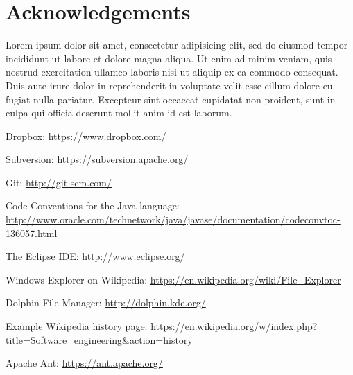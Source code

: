 \documentclass[12pt,a4paper]{article}
\begin{document}
\section{Acknowledgements}
Lorem ipsum dolor sit amet, consectetur adipisicing elit, sed do eiusmod tempor incididunt ut labore et dolore magna aliqua. Ut enim ad minim veniam, quis nostrud exercitation ullamco laboris nisi ut aliquip ex ea commodo consequat. Duis aute irure dolor in reprehenderit in voluptate velit esse cillum dolore eu fugiat nulla pariatur. Excepteur sint occaecat cupidatat non proident, sunt in culpa qui officia deserunt mollit anim id est laborum.

\begin{thebibliography}{9}

  Dropbox: \url{https://www.dropbox.com/}
  
  Subversion: \url{https://subversion.apache.org/}

  Git: \url{http://git-scm.com/}

  Code Conventions for the Java language: \url{http://www.oracle.com/technetwork/java/javase/documentation/codeconvtoc-136057.html}
  
  The Eclipse IDE: \url{http://www.eclipse.org/}

  Windows Explorer on Wikipedia: \url{https://en.wikipedia.org/wiki/File_Explorer}

  Dolphin File Manager: \url{http://dolphin.kde.org/}
  
  Example Wikipedia history page: \url{https://en.wikipedia.org/w/index.php?title=Software_engineering&action=history}
  
  Apache Ant: \url{https://ant.apache.org/}

\end{thebibliography}
\end{document}
